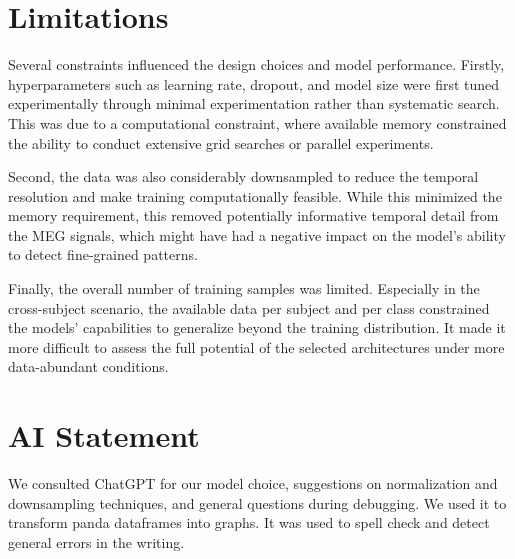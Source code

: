 \documentclass[conference]{IEEEtran}
\begin{document}
\section{Limitations}
Several constraints influenced the design choices and model performance. Firstly, hyperparameters such as learning rate, dropout, and model size were first tuned experimentally through minimal experimentation rather than systematic search. This was due to a computational constraint, where available memory constrained the ability to conduct extensive grid searches or parallel experiments.

Second, the data was also considerably downsampled to reduce the temporal resolution and make training computationally feasible. While this minimized the memory requirement, this removed potentially informative temporal detail from the MEG signals, which might have had a negative impact on the model's ability to detect fine-grained patterns.

Finally, the overall number of training samples was limited. Especially in the cross-subject scenario, the available data per subject and per class constrained the models' capabilities to generalize beyond the training distribution. It made it more difficult to assess the full potential of the selected architectures under more data-abundant conditions.

\section*{AI Statement}
We consulted ChatGPT for our model choice, suggestions on normalization and downsampling techniques, and general questions during debugging.  We used it to transform panda dataframes
into graphs. It was used to spell check and detect general errors in the writing.



\clearpage
\onecolumn
\end{document}
